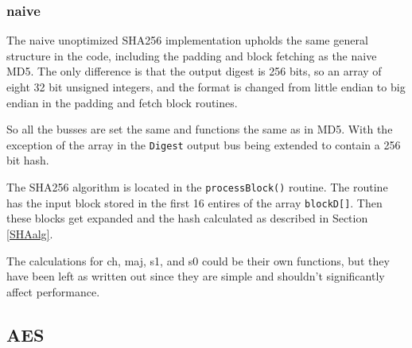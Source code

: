 \documentclass[a4paper]{article}
\begin{document}
\subsubsection{naive}
\label{AESnaive}
The naive unoptimized SHA256 implementation upholds the same general structure in the code, including the padding and block fetching as the naive MD5.
The only difference is that the output digest is 256 bits, so an array of eight 32 bit unsigned integers,
and the format is changed from little endian to big endian in the padding and fetch block routines.

So all the busses are set the same and functions the same as in MD5. With the exception of the array in the \texttt{Digest} output bus being extended to contain a 256 bit hash.

The SHA256 algorithm is located in the \texttt{processBlock()} routine.
The routine has the input block stored in the first 16 entires of the array \texttt{blockD[]}.
Then these blocks get expanded and the hash calculated as described in Section \ref{SHAalg}.

The calculations for ch, maj, s1, and s0 could be their own functions, but they have been left as written out since they are simple and shouldn't significantly affect performance.
\subsection{AES}
\label{sec:orgf1cb728}
\end{document}
